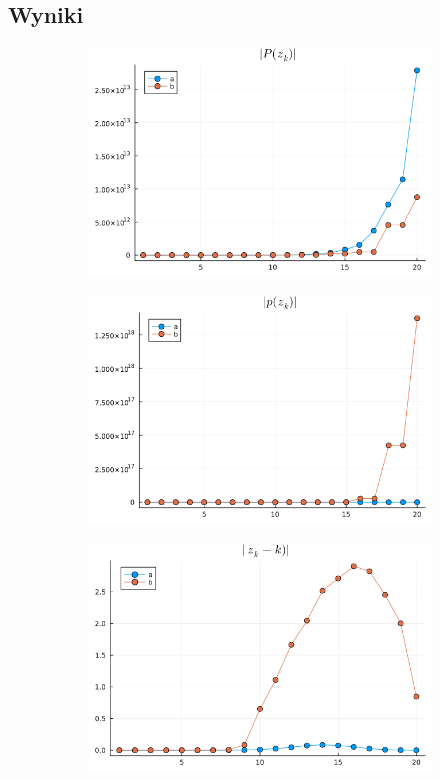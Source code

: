 \documentclass{article}
\def\v{0.47}
\begin{document}
\subsection*{Wyniki}
	\begin{figure}[H]
		\centering
		\begin{subfigure}[b]{\v\linewidth}
			\includegraphics[width=\linewidth]{graphs/4.1.png}
		\end{subfigure}
		\begin{subfigure}[b]{\v\linewidth}
			\includegraphics[width=\linewidth]{graphs/4.2.png}
		\end{subfigure}
		\begin{subfigure}[b]{\v\linewidth}
			\includegraphics[width=\linewidth]{graphs/4.3.png}
		\end{subfigure}
	\end{figure}
\end{document}
